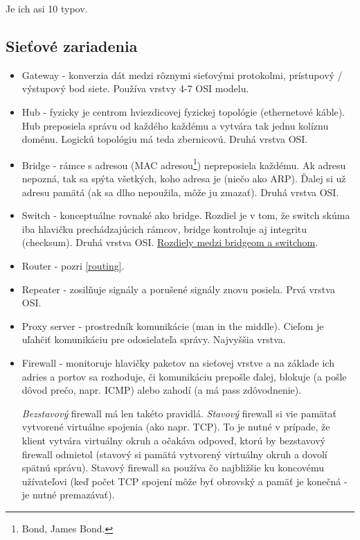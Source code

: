 \documentclass[10pt,a4paper]{article}
\begin{document}
Je ich asi 10 typov. 

\subsection{Sieťové zariadenia}           

\begin{itemize}
\item Gateway - konverzia dát medzi rôznymi sieťovými protokolmi, prístupový / výstupový bod siete. Používa vrstvy 4-7 OSI modelu. 
\item Hub - fyzicky je centrom hviezdicovej fyzickej topológie (ethernetové káble). Hub preposiela správu od každého každému a vytvára tak jednu kolíznu doménu. Logickú topológiu má teda zbernicovú. Druhá vrstva OSI. 
\item Bridge - rámce s adresou (MAC adresou\footnote{
Bond, James Bond. 
}) nepreposiela každému. Ak adresu nepozná, tak sa spýta všetkých, koho adresa je (niečo ako ARP). Ďalej si už adresu pamätá (ak sa dlho nepoužila, môže ju zmazať). Druhá vrstva OSI. 
\item Switch - konceptuálne rovnaké ako bridge. Rozdiel je v tom, že switch skúma iba hlavičku prechádzajúcich rámcov, bridge kontroluje aj integritu (checksum). Druhá vrstva OSI. \href{http://en.wikipedia.org/wiki/Ethernet#Bridging_and_switching}{Rozdiely medzi bridgeom a switchom}. 
\item Router - pozri \ref{routing}. 
\item Repeater - zosilňuje signály a porušené signály znovu posiela. Prvá vrstva OSI. 
\item Proxy server - prostredník komunikácie (man in the middle). Cieľom je uľahčiť komunikáciu pre odosielateľa správy. Najvyššia vrstva.  
\label{firewall} 
\item Firewall - monitoruje hlavičky paketov na sieťovej vrstve a na základe ich adries a portov sa rozhoduje, či komunikáciu prepošle ďalej, blokuje (a pošle dôvod prečo, napr. ICMP) alebo zahodí (a má pass zdôvodnenie). 

\emph{Bezstavový} firewall má len takéto pravidlá. \emph{Stavový} firewall si vie pamätať vytvorené virtuálne spojenia (ako napr. TCP). To je nutné v prípade, že klient vytvára virtuálny okruh a očakáva odpoveď, ktorú by bezstavový firewall odmietol (stavový si pamätá vytvorený virtuálny okruh a dovolí spätnú správu). Stavový firewall sa používa čo najbližšie ku koncovému užívateľovi (keď počet TCP spojení môže byť obrovský a pamäť je konečná - je nutné premazávať). 


\end{itemize}
\end{document}
